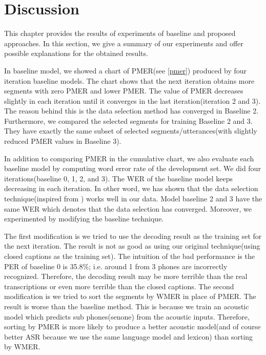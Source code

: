 \section{Discussion}
This chapter provides the results of experiments of baseline and proposed approaches. In this section, we give a summary of our experiments and offer possible explanations for the obtained results.

In baseline model, we showed a chart of PMER(see \ref{pmer}) produced by four iteration baseline models. The chart shows that the next iteration obtains more segments with zero PMER and lower PMER. The value of PMER decreases slightly in each iteration until it converges in the last iteration(iteration 2 and 3). The reason behind this is the data selection method has converged in Baseline 2. Furthermore, we compared the selected segments for training Baseline 2 and 3. They have exactly the same subset of selected segments/utterances(with slightly reduced PMER values in Baseline 3).

In addition to comparing PMER in the cumulative chart, we also evaluate each baseline model by computing word error rate of the development set. We did four iterations(baseline 0, 1, 2, and 3). The WER of the baseline model keeps decreasing in each iteration. In other word, we has shown that the data selection technique(inspired from \cite{Lanchantin2016}) works well in our data. Model baseline 2 and 3 have the same WER which denotes that the data selection has converged. Moreover, we experimented by modifying the baseline technique. 

The first modification is we tried to use the decoding result as the training set for the next iteration. The result is not as good as using our original technique(using closed captions as the training set). The intuition of the bad performance is the PER of baseline 0 is 35.8\%; i.e. around 1 from 3 phones are incorrectly recognized. Therefore, the decoding result may be more terrible than the real transcriptions or even more terrible than the closed captions. The second modification is we tried to sort the segments by WMER in place of PMER. The result is worse than the baseline method. This is because we train an acoustic model which predicts sub phones(senone) from the acoustic inputs. Therefore, sorting by PMER is more likely to produce a better acoustic model(and of course better ASR because we use the same language model and lexicon) than sorting by WMER.

